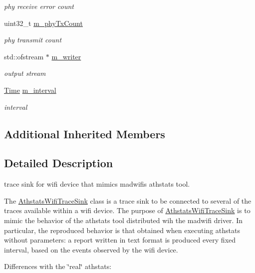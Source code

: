 \begin{DoxyCompactItemize}
\begin{DoxyCompactList}\small\item\em phy receive error count \end{DoxyCompactList}\item 
uint32\+\_\+t \hyperlink{classns3_1_1AthstatsWifiTraceSink_a92bf3040ddd1a97add4d6befabf88316}{m\+\_\+phy\+Tx\+Count}
\begin{DoxyCompactList}\small\item\em phy transmit count \end{DoxyCompactList}\item 
std\+::ofstream $\ast$ \hyperlink{classns3_1_1AthstatsWifiTraceSink_a465d42aea28db75a969edc01900f8bc0}{m\+\_\+writer}
\begin{DoxyCompactList}\small\item\em output stream \end{DoxyCompactList}\item 
\hyperlink{classns3_1_1Time}{Time} \hyperlink{classns3_1_1AthstatsWifiTraceSink_a3d4ca9a0e7fe7dbde084e343080929ff}{m\+\_\+interval}
\begin{DoxyCompactList}\small\item\em interval \end{DoxyCompactList}\end{DoxyCompactItemize}
\subsection*{Additional Inherited Members}


\subsection{Detailed Description}
trace sink for wifi device that mimics madwifi\textquotesingle{}s athstats tool. 

The \hyperlink{classns3_1_1AthstatsWifiTraceSink}{Athstats\+Wifi\+Trace\+Sink} class is a trace sink to be connected to several of the traces available within a wifi device. The purpose of \hyperlink{classns3_1_1AthstatsWifiTraceSink}{Athstats\+Wifi\+Trace\+Sink} is to mimic the behavior of the athstats tool distributed wih the madwifi driver. In particular, the reproduced behavior is that obtained when executing athstats without parameters\+: a report written in text format is produced every fixed interval, based on the events observed by the wifi device.

Differences with the \char`\"{}real\char`\"{} athstats\+:


